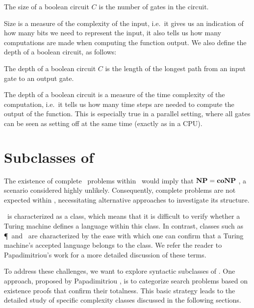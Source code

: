 \begin{definition}
    The size of a boolean circuit $C$ is the number of gates in the circuit.
\end{definition}

Size is a measure of the complexity of the input, i.e.\ it gives us an indication of how many bits we need to represent the input, it also tells us how many computations are made when computing the function output. We also define the depth of a boolean circuit, as follows:

\begin{definition}
    The depth of a boolean circuit $C$ is the length of the longest path from an input gate to an output gate.
\end{definition}

The depth of a boolean circuit is a measure of the time complexity of the computation, i.e.\ it tells us how many time steps are needed to compute the output of the function. This is especially true in a parallel setting, where all gates can be seen as setting off at the same time (exactly as in a CPU).

\section{Subclasses of \TFNP}

The existence of complete \FNP\ problems within \TFNP\ would imply that $\textbf{NP} = \textbf{coNP}$ , a scenario considered highly unlikely. Consequently, complete problems are not expected within \TFNP, necessitating alternative approaches to investigate its structure.

\TFNP\ is characterized as a  class, which means that it is difficult to verify whether a Turing machine defines a language within this class. In contrast,  classes such as \P\ and \NP\ are characterized by the ease with which one can confirm that a Turing machine's accepted language belongs to the class. We refer the reader to Papadimitriou's work  for a more detailed discussion of these terms.

To address these challenges, we want to explore syntactic subclasses of \TFNP. One approach, proposed by Papadimitriou \cite{papadimitriou_computational_1994}, is to categorize search problems based on existence proofs that confirm their totalness. This basic strategy leads to the detailed study of specific complexity classes discussed in the following sections.

